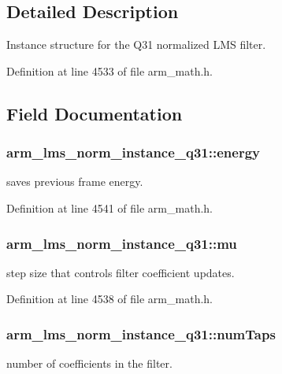 \subsection{Detailed Description}
Instance structure for the Q31 normalized L\-M\-S filter. 

Definition at line 4533 of file arm\-\_\-math.\-h.



\subsection{Field Documentation}
\hypertarget{structarm__lms__norm__instance__q31_a3c0ae42869afec8555dc8e3a7ef9b386}{
\subsubsection[{energy}]{ arm\-\_\-lms\-\_\-norm\-\_\-instance\-\_\-q31\-::energy}}\label{structarm__lms__norm__instance__q31_a3c0ae42869afec8555dc8e3a7ef9b386}
saves previous frame energy. 

Definition at line 4541 of file arm\-\_\-math.\-h.

\hypertarget{structarm__lms__norm__instance__q31_ad3dd2a2406e02fdaa7782ba6c3940a64}{
\subsubsection[{mu}]{ arm\-\_\-lms\-\_\-norm\-\_\-instance\-\_\-q31\-::mu}}\label{structarm__lms__norm__instance__q31_ad3dd2a2406e02fdaa7782ba6c3940a64}
step size that controls filter coefficient updates. 

Definition at line 4538 of file arm\-\_\-math.\-h.

\hypertarget{structarm__lms__norm__instance__q31_a28e4c085af69c9c3e2e95dacf8004c3e}{
\subsubsection[{num\-Taps}]{ arm\-\_\-lms\-\_\-norm\-\_\-instance\-\_\-q31\-::num\-Taps}}\label{structarm__lms__norm__instance__q31_a28e4c085af69c9c3e2e95dacf8004c3e}
number of coefficients in the filter. 

